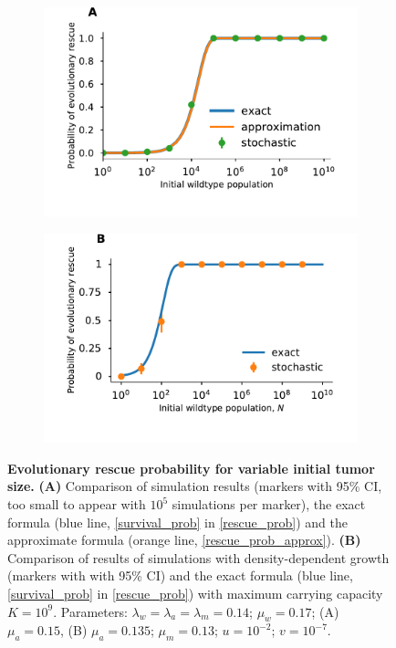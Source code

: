 \documentclass[12pt]{extarticle}
\begin{document}

\begin{figure}
\begin{subfigure}{0.5\textwidth}
\includegraphics[width=1\textwidth]{Figures/DeleteriousTauLeapPlot.pdf}
\end{subfigure}
\begin{subfigure}{0.5\textwidth}
\includegraphics[width=1\textwidth]{Figures/SurvPlotNDataLogisticK.pdf}
\end{subfigure}
\caption{\textbf{Evolutionary rescue probability for variable initial tumor size.}
\textbf{(A)} Comparison of simulation results (markers with 95\% CI, too small to appear with $10^5$ simulations per marker), the exact formula (blue line, \cref{survival_prob} in \cref{rescue_prob}) and the approximate formula (orange line, \cref{rescue_prob_approx}).
\textbf{(B)} Comparison of results of simulations  with density-dependent growth (markers with with 95\% CI) and the exact formula (blue line, \cref{survival_prob} in \cref{rescue_prob}) with maximum carrying capacity $K=10^9$.
Parameters: $\lambda_w=\lambda_a=\lambda_m=0.14$; $\mu_w=0.17$; (A) $\mu_a=0.15$, (B) $\mu_a=0.135$; $\mu_m=0.13$; $u=10^{-2}$; $v=10^{-7}$.
}
\label{rescue_prob_N}
\end{figure}
\end{document}
